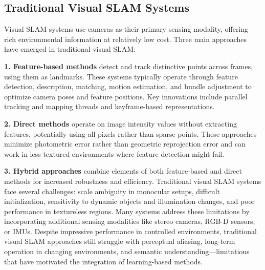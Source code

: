 \documentclass[12pt]{article}
\begin{document}
    \newpage
    \subsection{Traditional Visual SLAM Systems}
    Visual SLAM systems use cameras as their primary sensing modality, offering rich environmental information at relatively low cost. Three main approaches have emerged in traditional visual SLAM:
    
    \textbf{1. Feature-based methods} detect and track distinctive points across frames, using them as landmarks. These systems typically operate through feature detection, description, matching, 
    motion estimation, and bundle adjustment to optimize camera poses and feature positions. Key innovations include parallel tracking and mapping threads and keyframe-based representations.
    
    \textbf{2. Direct methods} operate on image intensity values without extracting features, potentially using all pixels rather than sparse points. These approaches minimize photometric error rather than 
    geometric reprojection error and can work in less textured environments where feature detection might fail.
    
    \textbf{3. Hybrid approaches} combine elements of both feature-based and direct methods for increased robustness and efficiency.
    Traditional visual SLAM systems face several challenges: scale ambiguity in monocular setups, difficult initialization, sensitivity to dynamic objects and illumination changes, and poor performance in textureless regions. 
    Many systems address these limitations by incorporating additional sensing modalities like stereo cameras, RGB-D sensors, or IMUs.
    Despite impressive performance in controlled environments, traditional visual SLAM approaches still struggle with perceptual aliasing, long-term operation in changing environments, and semantic 
    understanding—limitations that have motivated the integration of learning-based methods.

\end{document}
